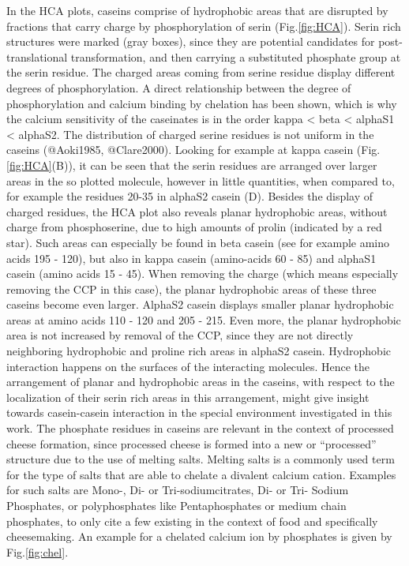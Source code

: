 \documentclass[
]{article}
\begin{document}
In the HCA plots, caseins comprise of hydrophobic areas that are
disrupted by fractions that carry charge by phosphorylation of serin
(Fig.\ref{fig:HCA}). Serin rich structures were marked (gray boxes),
since they are potential candidates for post-translational
transformation, and then carrying a substituted phosphate group at the
serin residue. The charged areas coming from serine residue display
different degrees of phosphorylation. A direct relationship between the
degree of phosphorylation and calcium binding by chelation has been
shown, which is why the calcium sensitivity of the caseinates is in the
order kappa \textless{} beta \textless{} alphaS1 \textless{} alphaS2.
The distribution of charged serine residues is not uniform in the
caseins (@Aoki1985, @Clare2000). Looking for example at kappa casein
(Fig.\ref{fig:HCA}(B)), it can be seen that the serin residues are
arranged over larger areas in the so plotted molecule, however in little
quantities, when compared to, for example the residues 20-35 in alphaS2
casein (D). Besides the display of charged residues, the HCA plot also
reveals planar hydrophobic areas, without charge from phosphoserine, due
to high amounts of prolin (indicated by a red star). Such areas can
especially be found in beta casein (see for example amino acids 195 -
120), but also in kappa casein (amino-acids 60 - 85) and alphaS1 casein
(amino acids 15 - 45). When removing the charge (which means especially
removing the CCP in this case), the planar hydrophobic areas of these
three caseins become even larger. AlphaS2 casein displays smaller planar
hydrophobic areas at amino acids 110 - 120 and 205 - 215. Even more, the
planar hydrophobic area is not increased by removal of the CCP, since
they are not directly neighboring hydrophobic and proline rich areas in
alphaS2 casein. Hydrophobic interaction happens on the surfaces of the
interacting molecules. Hence the arrangement of planar and hydrophobic
areas in the caseins, with respect to the localization of their serin
rich areas in this arrangement, might give insight towards casein-casein
interaction in the special environment investigated in this work. The
phosphate residues in caseins are relevant in the context of processed
cheese formation, since processed cheese is formed into a new or
``processed'' structure due to the use of melting salts. Melting salts
is a commonly used term for the type of salts that are able to chelate a
divalent calcium cation. Examples for such salts are Mono-, Di- or
Tri-sodiumcitrates, Di- or Tri- Sodium Phosphates, or polyphosphates
like Pentaphosphates or medium chain phosphates, to only cite a few
existing in the context of food and specifically cheesemaking. An
example for a chelated calcium ion by phosphates is given by
Fig.\ref{fig:chel}.
\end{document}
